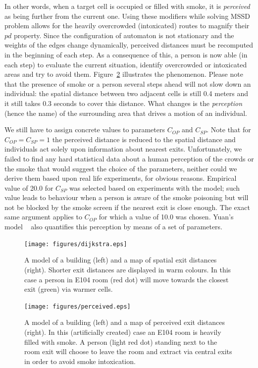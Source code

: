In other words, when a target cell is occupied or filled with smoke, it is
\emph{perceived} as being further from the current one.
Using these modifiers while solving MSSD problem allows for the heavily 
overcrowded (intoxicated) routes to magnify their $pd$ property.
Since the configuration of automaton is not stationary and the weights of the
edges change dynamically, perceived distances must be recomputed in the
beginning of each step.
As a consequence of this, a person is now able (in each step) to evaluate the 
current situation, identify overcrowded or intoxicated areas and try to avoid
them.
Figure~\ref{fig:perceived} illustrates the phenomenon.
Please note that the presence of smoke or a person several steps ahead will not
slow down an individual: the spatial distance between two adjacent cells is
still 0.4 meters and it still takes 0.3 seconds to cover this distance.
What changes is the \emph{perception} (hence the name) of the surrounding area
that drives a motion of an individual.

We still have to assign concrete values to parameters $C_{OP}$ and $C_{SP}$.
Note that for $C_{OP} = C_{SP} = 1$ the perceived distance is reduced to the
spatial distance and individuals act solely upon information about nearest exits. 
Unfortunately, we failed to find any hard statistical data about a human
perception of the crowds or the smoke that would suggest the choice of the
parameters, neither could we derive them based upon real life experiments, for
obvious reasons. 
Empirical value of 20.0 for $C_{SP}$ was selected based on experiments with the 
model; such value leads to behaviour when a person is aware of the smoke
poisoning but will not be blocked by the smoke screen if the nearest exit is
close enough.
The exact same argument applies to $C_{OP}$ for which a value of 10.0 was chosen.
Yuan's model ~\cite{Yuan} also quantifies this perception by means of a set
of parameters.

\begin{figure}
    \texttt{[image: figures/dijkstra.eps]}
    \caption{
        A model of a building (left) and a map of spatial exit distances
        (right).
        Shorter exit distances are displayed in warm colours.
        In this case a person in E104 room (red dot) will move towards the
        closest exit (green) via warmer cells.
    }
    \label{fig:dijkstra}
\end{figure}

\begin{figure}
    \texttt{[image: figures/perceived.eps]}
    \caption{
        A model of a building (left) and a map of perceived exit
        distances (right).
        In this (artificially created) case an E104 room is heavily filled with
        smoke.
        A person (light red dot) standing next to the room exit will choose to
        leave the room and extract via central exits in order to avoid smoke
        intoxication.
    }
    \label{fig:perceived}
\end{figure}
 
